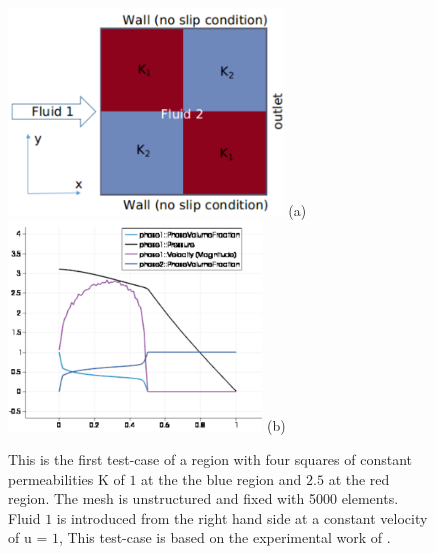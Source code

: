 \begin{figure}[ht]
\vbox{
\hbox{\includegraphics[width=0.65\textwidth]{./Pics/2b2_P1DGP2}}
\vspace{-0.cm}
\hbox{\hspace{5cm}(a)}
\vspace{-0.cm}
\hbox{\includegraphics[width=0.6\textwidth]{./Pics/2b2_P1DGP2_plot}}
\vspace{-0.cm}
\hbox{\hspace{5cm}(b)}
}\caption{This is the first test-case of a region with four squares of constant permeabilities K of $1$ at the the blue region and $2.5$ at the red region. The mesh is unstructured and fixed with 5000 elements. Fluid $1$ is introduced from the right hand side at a constant velocity of u = $1$, This test-case is based on the experimental work of \citet{evans_1994}.}\label{fig:square}
\end{figure}

